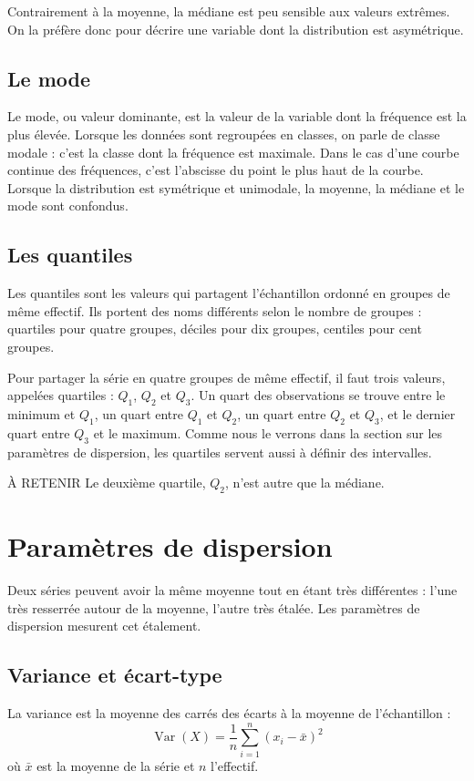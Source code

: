Contrairement à la moyenne, la médiane est peu sensible aux valeurs extrêmes. On la préfère donc pour décrire une variable dont la distribution est asymétrique.

\subsection{Le mode}
Le mode, ou valeur dominante, est la valeur de la variable dont la fréquence est la plus élevée.
Lorsque les données sont regroupées en classes, on parle de classe modale : c'est la classe dont la fréquence est maximale. Dans le cas d'une courbe continue des fréquences, c'est l'abscisse du point le plus haut de la courbe.
Lorsque la distribution est symétrique et unimodale, la moyenne, la médiane et le mode sont confondus.

\subsection{Les quantiles}
Les quantiles sont les valeurs qui partagent l'échantillon ordonné en groupes de même effectif. Ils portent des noms différents selon le nombre de groupes : quartiles pour quatre groupes, déciles pour dix groupes, centiles pour cent groupes.

Pour partager la série en quatre groupes de même effectif, il faut trois valeurs, appelées quartiles : $Q_1$, $Q_2$ et $Q_3$. Un quart des observations se trouve entre le minimum et $Q_1$, un quart entre $Q_1$ et $Q_2$, un quart entre $Q_2$ et $Q_3$, et le dernier quart entre $Q_3$ et le maximum. Comme nous le verrons dans la section sur les paramètres de dispersion, les quartiles servent aussi à définir des intervalles.

\begin{mybox}[colbacktitle=NOTE]{\faInfoCircle{} À RETENIR}
Le deuxième quartile, $Q_2$, n'est autre que la médiane.
\end{mybox}

\section{Paramètres de dispersion}
Deux séries peuvent avoir la même moyenne tout en étant très différentes : l'une très resserrée autour de la moyenne, l'autre très étalée. Les paramètres de dispersion mesurent cet étalement.

\subsection{Variance et écart-type}
La variance est la moyenne des carrés des écarts à la moyenne de l'échantillon :
\[
\operatorname{Var}(X)=\frac{1}{n}\sum_{i=1}^n \left(x_i-\bar{x}\right)^2
\]
où $\bar{x}$ est la moyenne de la série et $n$ l'effectif.

